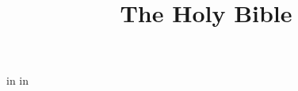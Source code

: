 
 in
 in

\nopagenumbers
\title{The Holy Bible}





































































\bye
